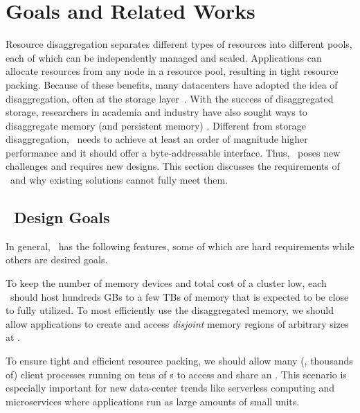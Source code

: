 \section{Goals and Related Works}
\label{sec:clio:motivation}

Resource disaggregation 
separates different types of resources into different pools,
each of which can be independently managed and scaled.
Applications can allocate resources from any node in a resource pool, resulting in tight resource packing. %
Because of these benefits, %
many datacenters have adopted the idea of disaggregation, often at the storage 
layer~\cite{FACEBOOK-BRYCECANYON,FB1,SnowFlake-NSDI20,AMAZON-S3,AMAZON-EBS,Pangu,FC-SAN-book}.
With the success of disaggregated storage,
researchers in academia and industry have also sought ways to disaggregate memory
(and persistent memory)
\cite{Lim09-disaggregate,FireBox-FASTKeynote,IntelRackScale,Lim12-HPCA,Shan18-OSDI,hotpot-socc17,RAMCloud,Tsai20-ATC,AIFM,FastSwap,InfiniSwap,Semeru,Nitu18-EUROSYS}.
Different from storage disaggregation,
\md\ needs to achieve at least an order of magnitude higher performance and it should offer a byte-addressable interface.
Thus, \md\ poses new challenges and requires new designs.
This section discusses the requirements of \md\ and why existing solutions cannot fully meet them.

\subsection{\md\ Design Goals}
\label{sec:clio:requirements}
In general, \md\ has the following features, some of which are hard requirements while others are desired goals.

To keep the number of memory devices and total cost of a cluster low,
each \MN\ should host hundreds GBs to a few TBs of memory that is expected to be close to fully utilized.
To most efficiently use the disaggregated memory, we should allow applications to create and access {\em disjoint} memory regions of arbitrary sizes at \MN.

To ensure tight and efficient resource packing,
we should allow many (\eg, thousands of) client processes running on tens of \CN{}s to access and share an \MN.
This scenario is especially important for new data-center trends like serverless computing and microservices where applications run as large amounts of small units.

